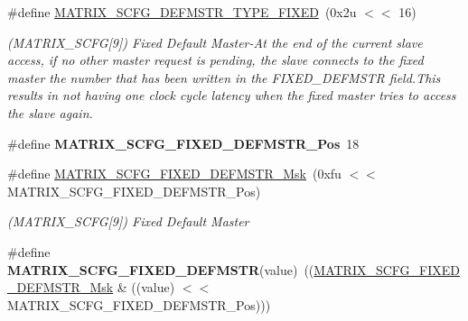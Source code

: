 \begin{DoxyCompactItemize}
\mbox{\label{group__SAMV71__MATRIX_ga8d89957356611bdf1a256db82a84c465}} 
\#define \mbox{\hyperlink{group__SAMV71__MATRIX_ga8d89957356611bdf1a256db82a84c465}{M\+A\+T\+R\+I\+X\+\_\+\+S\+C\+F\+G\+\_\+\+D\+E\+F\+M\+S\+T\+R\+\_\+\+T\+Y\+P\+E\+\_\+\+F\+I\+X\+ED}}~(0x2u $<$$<$ 16)
\begin{DoxyCompactList}\small\item\em (M\+A\+T\+R\+I\+X\+\_\+\+S\+C\+FG\mbox{[}9\mbox{]}) Fixed Default Master-\/\+At the end of the current slave access, if no other master request is pending, the slave connects to the fixed master the number that has been written in the F\+I\+X\+E\+D\+\_\+\+D\+E\+F\+M\+S\+TR field.\+This results in not having one clock cycle latency when the fixed master tries to access the slave again. \end{DoxyCompactList}\item 
\mbox{\label{group__SAMV71__MATRIX_ga7bf8c13ca20168061abe83d20ee4aaa4}} 
\#define {\bfseries M\+A\+T\+R\+I\+X\+\_\+\+S\+C\+F\+G\+\_\+\+F\+I\+X\+E\+D\+\_\+\+D\+E\+F\+M\+S\+T\+R\+\_\+\+Pos}~18
\item 
\mbox{\label{group__SAMV71__MATRIX_gaf1a2cf87724c9cc01ba7745ced4d4a29}} 
\#define \mbox{\hyperlink{group__SAMV71__MATRIX_gaf1a2cf87724c9cc01ba7745ced4d4a29}{M\+A\+T\+R\+I\+X\+\_\+\+S\+C\+F\+G\+\_\+\+F\+I\+X\+E\+D\+\_\+\+D\+E\+F\+M\+S\+T\+R\+\_\+\+Msk}}~(0xfu $<$$<$ M\+A\+T\+R\+I\+X\+\_\+\+S\+C\+F\+G\+\_\+\+F\+I\+X\+E\+D\+\_\+\+D\+E\+F\+M\+S\+T\+R\+\_\+\+Pos)
\begin{DoxyCompactList}\small\item\em (M\+A\+T\+R\+I\+X\+\_\+\+S\+C\+FG\mbox{[}9\mbox{]}) Fixed Default Master \end{DoxyCompactList}\item 
\mbox{\label{group__SAMV71__MATRIX_ga5f96e7339f9cb48e52291ef59a619ad1}} 
\#define {\bfseries M\+A\+T\+R\+I\+X\+\_\+\+S\+C\+F\+G\+\_\+\+F\+I\+X\+E\+D\+\_\+\+D\+E\+F\+M\+S\+TR}(value)~((\mbox{\hyperlink{group__SAMV71__MATRIX_gaf1a2cf87724c9cc01ba7745ced4d4a29}{M\+A\+T\+R\+I\+X\+\_\+\+S\+C\+F\+G\+\_\+\+F\+I\+X\+E\+D\+\_\+\+D\+E\+F\+M\+S\+T\+R\+\_\+\+Msk}} \& ((value) $<$$<$ M\+A\+T\+R\+I\+X\+\_\+\+S\+C\+F\+G\+\_\+\+F\+I\+X\+E\+D\+\_\+\+D\+E\+F\+M\+S\+T\+R\+\_\+\+Pos)))
\item 
\mbox{\label{group__SAMV71__MATRIX_gaf4eb749b4f287949fd3478c4eb762318}} 
$$
\end{DoxyCompactItemize}
